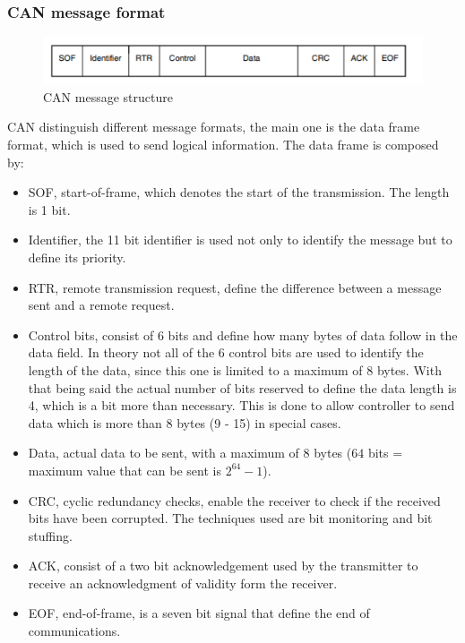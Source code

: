 \documentclass[../main.tex]{subfiles}
\begin{document}
\subsubsection{CAN message format}
\begin{figure}[H]
    \centering
    \includegraphics[width=\linewidth]{images_folder/can message.png}
    \caption{CAN message structure}
    \label{fig:CANMSG}
\end{figure}
\gls{CAN} distinguish different message formats, the main one is the data frame format, which is used to send logical information. The data frame is composed by:
\begin{itemize}
    \item \gls{SOF}, start-of-frame, which denotes the start of the transmission. The length is 1 bit. 
    \item Identifier, the 11 bit identifier is used not only to identify the message but to define its priority. 
    \item \gls{RTR}, remote transmission request, define the difference between a message sent and a remote request. 
    \item Control bits, consist of 6 bits and define how many bytes of data follow in the data field. In theory not all of the 6 control bits are used to identify the length of the data, since this one is limited to a maximum of 8 bytes. With that being said the actual number of bits reserved to define the data length is 4, which is a bit more than necessary. This is done to allow controller to send data which is more than 8 bytes (9 - 15) in special cases.
    \item Data, actual data to be sent, with a maximum of 8 bytes ($64$ bits = maximum value that can be sent is $2^{64} - 1$).
    \item \gls{CRC}, cyclic redundancy checks, enable the receiver to check if the received bits have been corrupted. The techniques used are bit monitoring and bit stuffing.
    \item \gls{ACK}, consist of a two bit acknowledgement used by the transmitter to receive an acknowledgment of validity form the receiver.
    \item \gls{EOF}, end-of-frame, is a seven bit signal that define the end of communications. 
\end{itemize}
\end{document}
